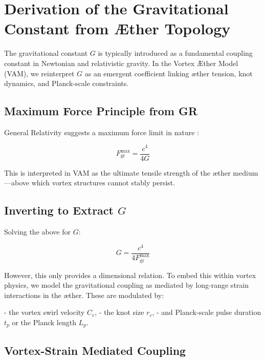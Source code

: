 
\section{Derivation of the Gravitational Constant from Æther Topology}
\label{appendix:G}

The gravitational constant \( G \) is typically introduced as a fundamental coupling constant in Newtonian and relativistic gravity. In the Vortex Æther Model (VAM), we reinterpret \( G \) as an emergent coefficient linking æther tension, knot dynamics, and Planck-scale constraints.

\subsection*{Maximum Force Principle from GR}

General Relativity suggests a maximum force limit in nature \cite{scharf2016force, barcelo2011}:

\begin{equation}
    F^{\text{max}}_{\text{gr}} = \frac{c^4}{4G}
\end{equation}

This is interpreted in VAM as the ultimate tensile strength of the æther medium—above which vortex structures cannot stably persist.

\subsection*{Inverting to Extract \( G \)}

Solving the above for \( G \):

\begin{equation}
    G = \frac{c^4}{4 F^{\text{max}}_{\text{gr}}}
\end{equation}

However, this only provides a dimensional relation. To embed this within vortex physics, we model the gravitational coupling as mediated by long-range strain interactions in the æther. These are modulated by:

- the vortex swirl velocity \( C_e \),
- the knot size \( r_c \),
- and Planck-scale pulse duration \( t_p \) or the Planck length \( L_p \).

\subsection*{Vortex-Strain Mediated Coupling}

